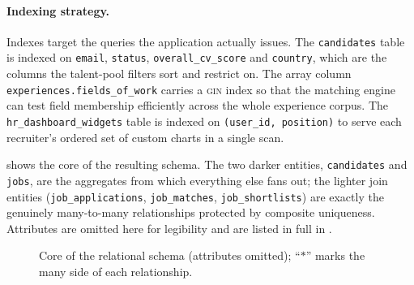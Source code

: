 \paragraph{Indexing strategy.}
Indexes target the queries the application actually issues. The
\texttt{candidates} table is indexed on \texttt{email}, \texttt{status},
\texttt{overall\_cv\_score} and \texttt{country}, which are the columns the
talent-pool filters sort and restrict on. The array column
\texttt{experiences.fields\_of\_work} carries a \textsc{gin} index so that the
matching engine can test field membership efficiently across the whole
experience corpus. The \texttt{hr\_dashboard\_widgets} table is indexed on
\texttt{(user\_id, position)} to serve each recruiter's ordered set of custom
charts in a single scan.

 shows the core of the resulting schema. The two darker
entities, \texttt{candidates} and \texttt{jobs}, are the aggregates from
which everything else fans out; the lighter join entities
(\texttt{job\_applications}, \texttt{job\_matches}, \texttt{job\_shortlists})
are exactly the genuinely many-to-many relationships protected by composite
uniqueness. Attributes are omitted here for legibility and are listed in full
in .

\begin{figure}[ht]
\centering
{}
\caption[Core entity--relationship diagram]{Core of the relational schema
(attributes omitted); ``$*$'' marks the many side of each relationship.}
\label{fig:er}
\end{figure}

